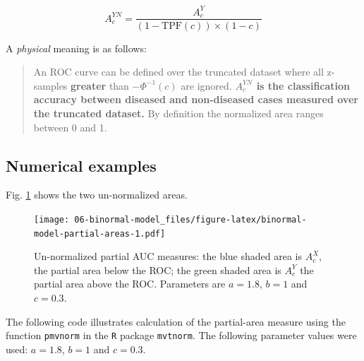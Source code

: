 \documentclass[
]{book}
\begin{document}
\begin{equation}
A_c^{YN} = \frac{A_c^{Y}}{\left (1 - \text{TPF}(c)  \right ) \times \left (1-c  \right )}
\label{eq:binormal-model-normalized-partial-auc-upper2}
\end{equation}

A \emph{physical} meaning is as follows:

\begin{quote}
An ROC curve can be defined over the truncated dataset where all z-samples \textbf{greater} than \(-\Phi^{-1}(c)\) are ignored. \textbf{\(A_c^{YN}\) is the classification accuracy between diseased and non-diseased cases measured over the truncated dataset.} By definition the normalized area ranges between 0 and 1.
\end{quote}

\hypertarget{binormal-model-metz-partial-auc-example}{%
\subsection{Numerical examples}\label{binormal-model-metz-partial-auc-example}}

Fig. \ref{fig:binormal-model-partial-areas} shows the two un-normalized areas.

\begin{figure}
\centering
\texttt{[image: 06-binormal-model\_files/figure-latex/binormal-model-partial-areas-1.pdf]}
\caption{\label{fig:binormal-model-partial-areas}Un-normalized partial AUC measures: the blue shaded area is \(A_c^{X}\), the partial area below the ROC; the green shaded area is \(A_c^{Y}\) the partial area above the ROC. Parameters are \(a = 1.8\), \(b = 1\) and \(c = 0.3\).}
\end{figure}

The following code illustrates calculation of the partial-area measure using the function \texttt{pmvnorm} in the \texttt{R} package \texttt{mvtnorm}. The following parameter values were used: \(a = 1.8\), \(b = 1\) and \(c = 0.3\).
\end{document}
